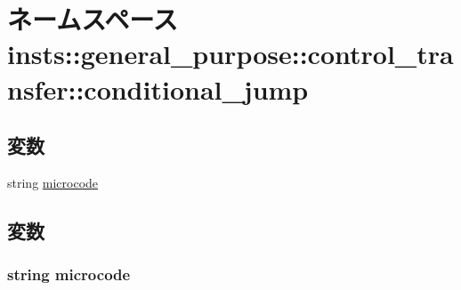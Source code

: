 \hypertarget{namespaceinsts_1_1general__purpose_1_1control__transfer_1_1conditional__jump}{
\section{ネームスペース insts::general\_\-purpose::control\_\-transfer::conditional\_\-jump}
\label{namespaceinsts_1_1general__purpose_1_1control__transfer_1_1conditional__jump}
}
\subsection*{変数}
\begin{DoxyCompactItemize}
\item 
string \hyperlink{namespaceinsts_1_1general__purpose_1_1control__transfer_1_1conditional__jump_a770f11a173e99389a8802f0107ed8f52}{microcode}
\end{DoxyCompactItemize}


\subsection{変数}
\hypertarget{namespaceinsts_1_1general__purpose_1_1control__transfer_1_1conditional__jump_a770f11a173e99389a8802f0107ed8f52}{
\subsubsection[{microcode}]{\setlength{\rightskip}{0pt plus 5cm}string {\bf microcode}}}
\label{namespaceinsts_1_1general__purpose_1_1control__transfer_1_1conditional__jump_a770f11a173e99389a8802f0107ed8f52}
